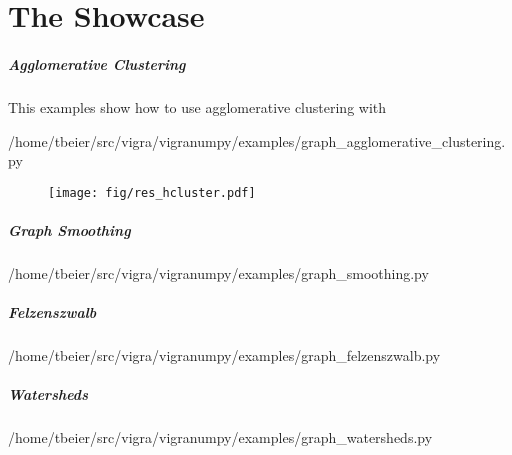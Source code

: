 \flushleft
\chapter{The Showcase}\label{ch:the_showcase} 


\newpage
\paragraph{Agglomerative Clustering}
This examples show how to use agglomerative clustering with 




{/home/tbeier/src/vigra/vigranumpy/examples/graph_agglomerative_clustering.py}
\begin{figure}
\centering
\texttt{[image: fig/res\_hcluster.pdf]}
\end{figure}


\paragraph{Graph Smoothing}

{/home/tbeier/src/vigra/vigranumpy/examples/graph_smoothing.py}

\paragraph{Felzenszwalb}

{/home/tbeier/src/vigra/vigranumpy/examples/graph_felzenszwalb.py}

\paragraph{Watersheds}

{/home/tbeier/src/vigra/vigranumpy/examples/graph_watersheds.py}